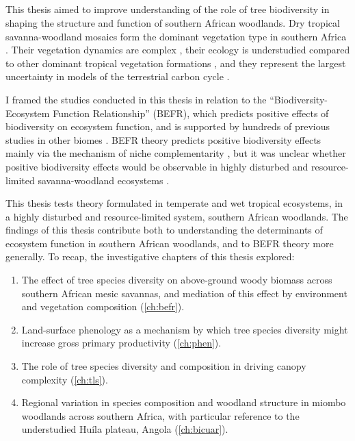 \begin{refsection}


\chapter{\chaptertitle}
\label{ch:discussion}

This thesis aimed to improve understanding of the role of tree biodiversity in shaping the structure and function of southern African woodlands. Dry tropical savanna-woodland mosaics form the dominant vegetation type in southern Africa \citep{Arino2010}. Their vegetation dynamics are complex \citep{Scholes1997}, their ecology is understudied compared to other dominant tropical vegetation formations \citep{Hill2010}, and they represent the largest uncertainty in models of the terrestrial carbon cycle \citep{Sitch2015, Williams2007}.

I framed the studies conducted in this thesis in relation to the ``Biodiversity-Ecosystem Function Relationship'' (BEFR), which predicts positive effects of biodiversity on ecosystem function, and is supported by hundreds of previous studies in other biomes \citep{Tilman2014, Plas2019}. BEFR theory predicts positive biodiversity effects mainly via the mechanism of niche complementarity \citep{Cardinale2009}, but it was unclear whether positive biodiversity effects would be observable in highly disturbed and resource-limited savanna-woodland ecosystems \citep{Tilman2014}. 

This thesis tests theory formulated in temperate and wet tropical ecosystems, in a highly disturbed and resource-limited system, southern African woodlands. The findings of this thesis contribute both to understanding the determinants of ecosystem function in southern African woodlands, and to BEFR theory more generally. To recap, the investigative chapters of this thesis explored: 

\begin{enumerate}
	\item{The effect of tree species diversity on above-ground woody biomass across southern African mesic savannas, and mediation of this effect by environment and vegetation composition (\autoref{ch:befr}).}
	\item{Land-surface phenology as a mechanism by which tree species diversity might increase gross primary productivity (\autoref{ch:phen}).}
	\item{The role of tree species diversity and composition in driving canopy complexity (\autoref{ch:tls}).}
	\item{Regional variation in species composition and woodland structure in miombo woodlands across southern Africa, with particular reference to the understudied Hu\'{i}la plateau, Angola (\autoref{ch:bicuar}).}
\end{enumerate}


\end{refsection}
